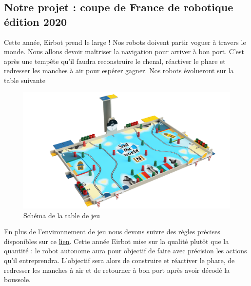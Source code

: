 \documentclass[a4paper,10pt]{article}
\begin{document}
\begin{spacing}{1.5}
\section*{Notre projet : coupe de France de robotique édition 2020}
Cette année, Eirbot prend le large ! Nos robots doivent partir voguer à travers
le monde. Nous allons devoir maîtriser la navigation pour arriver à bon port.
C'est après une tempête qu'il faudra reconstruire le chenal, réactiver le phare
et redresser les manches à air pour espérer gagner. Nos robots évolueront sur la
table suivante
\begin{figure}[H]
  \center
  \includegraphics[scale=0.2]{table.png}
  \caption{Schéma de la table de jeu}
\end{figure}
En plus de l'environnement de jeu nous devons suivre des règles précises
disponibles sur ce \href{https://www.coupederobotique.fr/wp-content/uploads/Eurobot2020_Rules_Cup_OFFICIAL_FR.pdf}{lien}.
Cette année Eirbot mise sur la qualité plutôt que la quantité : le robot
autonome aura pour objectif de faire avec précision les actions qu'il
entreprendra. L'objectif sera alors de construire et réactiver le phare, de redresser les
manches à air et de retourner à bon port après avoir décodé la boussole.


\end{spacing}
\end{document}
